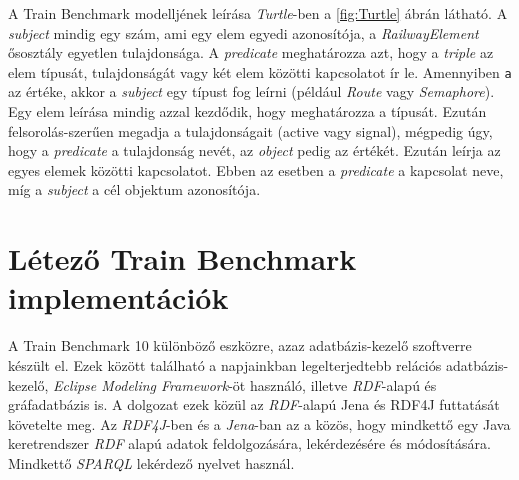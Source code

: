 A Train Benchmark modelljének leírása \emph{Turtle}-ben a \ref{fig:Turtle} ábrán látható. A \emph{subject} mindig egy szám, ami egy elem egyedi azonosítója, a \emph{RailwayElement} ősosztály egyetlen tulajdonsága. A \emph{predicate} meghatározza azt, hogy a \emph{triple} az elem típusát, tulajdonságát vagy két elem közötti kapcsolatot ír le. Amennyiben \texttt{a} az értéke, akkor a \emph{subject} egy típust fog leírni (például \emph{Route} vagy \emph{Semaphore}). Egy elem leírása mindig azzal kezdődik, hogy meghatározza a típusát. Ezután felsorolás-szerűen megadja a tulajdonságait (active vagy signal), mégpedig úgy, hogy a \emph{predicate} a tulajdonság nevét, az \emph{object} pedig az értékét. Ezután leírja az egyes elemek közötti kapcsolatot. Ebben az esetben a \emph{predicate} a kapcsolat neve, míg a \emph{subject} a cél objektum azonosítója. 



\section{Létező Train Benchmark implementációk}

A Train Benchmark 10 különböző eszközre, azaz adatbázis-kezelő szoftverre készült el. Ezek között található a napjainkban legelterjedtebb relációs adatbázis-kezelő, \emph{Eclipse Modeling Framework}-öt használó, illetve \emph{RDF}-alapú és gráfadatbázis is. A dolgozat ezek közül az \emph{RDF}-alapú Jena és  RDF4J futtatását követelte meg.
Az \emph{RDF4J}-ben és a \emph{Jena}-ban az a közös, hogy mindkettő egy Java keretrendszer \emph{RDF} alapú adatok feldolgozására, lekérdezésére és módosítására. Mindkettő \emph{SPARQL} lekérdező nyelvet használ.